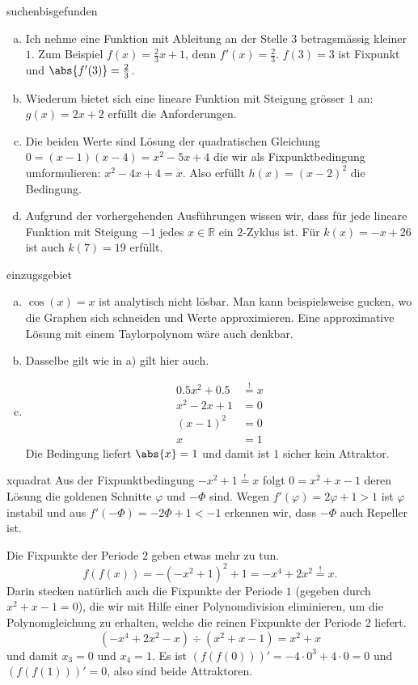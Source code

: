\documentclass[%
<<<<<<< Updated upstream
11pt,%
twoside,%
titlepage,%
german,%
headsepline%
]{scrartcl}
\begin{document}
\begin{lsg}{suchenbisgefunden}	
\begin{enumerate}[a)]
\item Ich nehme eine Funktion mit Ableitung an der Stelle $3$ betragsmässig kleiner $1$. Zum Beispiel $f(x)=\frac{2}{3}x+1$, denn $f'(x)=\frac{2}{3}$. $f(3)=3$ ist Fixpunkt und $\abs{f'(3)}=\frac{2}{3}$.
\item Wiederum bietet sich eine lineare Funktion mit Steigung grösser $1$ an: $g(x)=2x+2$ erfüllt die Anforderungen.
\item Die beiden Werte sind Lösung der quadratischen Gleichung $0=(x-1)(x-4)=x^2-5x+4$ die wir als Fixpunktbedingung umformulieren: $x^2-4x+4=x$. Also erfüllt $h(x)=(x-2)^2$ die Bedingung.
\item Aufgrund der vorhergehenden Ausführungen wissen wir, dass für jede lineare Funktion mit Steigung $-1$ jedes $x\in\mathbb{R}$ ein $2$-Zyklus ist. Für $k(x)=-x+26$ ist auch $k(7)=19$ erfüllt.
\end{enumerate}
\end{lsg}
\begin{lsg}{einzugsgebiet}
    \begin{enumerate}[a)]
        \item $\cos(x)=x$ ist analytisch nicht lösbar. Man kann beispielsweise gucken, wo die Graphen sich schneiden und Werte approximieren. Eine approximative Lösung mit einem Taylorpolynom wäre auch denkbar.
        \item Dasselbe gilt wie in a) gilt hier auch.
        \item \begin{align*}
            0.5x^2+0.5 &\stackrel{!}{=} x\\
            x^2-2x+1 &= 0\\
            (x-1)^2 &= 0\\
            x &= 1
        \end{align*}
        Die Bedingung liefert $\abs{x}=1$ und damit ist $1$ sicher kein Attraktor.
    \end{enumerate}
\end{lsg}
\begin{lsg}{xquadrat}
    Aus der Fixpunktbedingung $-x^2+1\stackrel{!}{=}x$ folgt $0=x^2+x-1$ deren Lösung die goldenen Schnitte $\varphi$ und $-\Phi$ sind. Wegen $f'(\varphi)=2\varphi+1>1$ ist $\varphi$ instabil und aus $f'(-\Phi)=-2\Phi+1<-1$ erkennen wir, dass $-\Phi$ auch Repeller ist.

    Die Fixpunkte der Periode $2$ geben etwas mehr zu tun.
    $$f(f(x))=-(-x^2+1)^2+1=-x^4+2x^2\stackrel{!}{=}x.$$
    Darin stecken natürlich auch die Fixpunkte der Periode $1$ (gegeben durch $x^2+x-1=0$), die wir mit Hilfe einer Polynomdivision eliminieren, um die Polynomgleichung zu erhalten, welche die reinen Fixpunkte der Periode 2 liefert.
    $$(-x^4+2x^2-x)\div(x^2+x-1)=x^2+x$$
    und damit $x_3=0$ und $x_4=1$. Es ist $(f(f(0)))'=-4\cdot0^3+4\cdot0=0$ und $(f(f(1)))'=0$, also sind beide Attraktoren.
\end{lsg}
\end{document}
